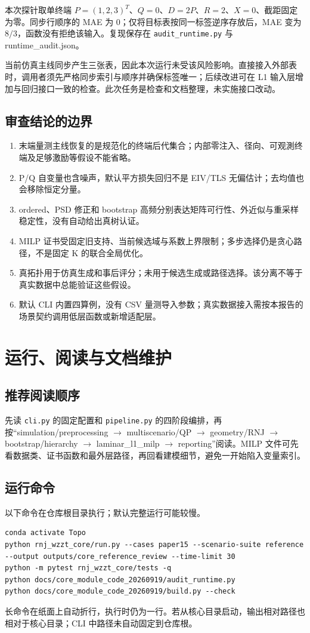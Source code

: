 \documentclass[UTF8,11pt,a4paper,fontset=windows]{ctexart}
\begin{document}
本次探针取单终端 $P=(1,2,3)^T$、$Q=0$、$D=2P$、$R=2$、$X=0$、截距固定为零。同步行顺序的 MAE 为 0；仅将目标表按同一标签逆序存放后，MAE 变为 $8/3$，函数没有拒绝该输入。复现保存在 \nolinkurl{audit_runtime.py} 与 runtime\_audit.json。

当前仿真主线同步产生三张表，因此本次运行未受该风险影响。直接接入外部表时，调用者须先严格同步索引与顺序并确保标签唯一；后续改进可在 L1 输入层增加与回归接口一致的检查。此次任务是检查和文档整理，未实施接口改动。

\subsection{审查结论的边界}
\begin{enumerate}
\item 末端量测主线恢复的是规范化的终端后代集合；内部零注入、径向、可观測终端及足够激励等假设不能省略。
\item P/Q 自变量也含噪声，默认平方损失回归不是 EIV/TLS 无偏估计；去均值也会移除恒定分量。
\item ordered、PSD 修正和 bootstrap 高频分别表达矩阵可行性、外近似与重采样稳定性，没有自动给出真树认证。
\item MILP 证书受固定旧支持、当前候选域与系数上界限制；多步选择仍是贪心路径，不是固定 K 的联合全局优化。
\item 真拓扑用于仿真生成和事后评分；未用于候选生成或路径选择。该分离不等于真实数据中总能验证这些假设。
\item 默认 CLI 内置四算例，没有 CSV 量测导入参数；真实数据接入需按本报告的场景契约调用低层函数或新增适配层。
\end{enumerate}

\section{运行、阅读与文档维护}
\subsection{推荐阅读顺序}
先读 \nolinkurl{cli.py} 的固定配置和 \nolinkurl{pipeline.py} 的四阶段编排，再按“simulation/preprocessing $\to$ multiscenario/QP $\to$ geometry/RNJ $\to$ bootstrap/hierarchy $\to$ laminar\_l1\_milp $\to$ reporting”阅读。MILP 文件可先看数据类、证书函数和最外层路径，再回看建模细节，避免一开始陷入变量索引。

\subsection{运行命令}
以下命令在仓库根目录执行；默认完整运行可能较慢。
\begin{Verbatim}[fontsize=\small,breaklines=true,frame=leftline]
conda activate Topo
python rnj_wzzt_core/run.py --cases paper15 --scenario-suite reference --output outputs/core_reference_review --time-limit 30
python -m pytest rnj_wzzt_core/tests -q
python docs/core_module_code_20260919/audit_runtime.py
python docs/core_module_code_20260919/build.py --check
\end{Verbatim}
长命令在纸面上自动折行，执行时仍为一行。若从核心目录启动，输出相对路径也相对于核心目录；CLI 中路径未自动固定到仓库根。
\end{document}
